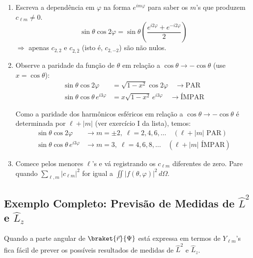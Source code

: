 \begin{enumerate}
    \item[i)] Escreva a dependência em $\varphi$ na forma $e^{im\varphi}$ para saber os $m$'s que produzem $c_{\ell m} \ne 0$.
    \begin{equation}
        \sin\theta\cos2\varphi = \sin\theta\left(\frac{e^{i2\varphi}+e^{-i2\varphi}}{2}\right)
    \label{eq:aula22_dica1_exemplo}
    \end{equation}
    $\Rightarrow$ apenas $c_{2,2}$ e $c_{2,\bar{2}}$ (isto é, $c_{2,-2}$) são não nulos.

    \item[ii)] Observe a paridade da função de $\theta$ em relação a $\cos\theta \to -\cos\theta$ (use $x=\cos\theta$):
    \begin{align}
        \sin\theta\cos2\varphi &= \sqrt{1-x^2}\cos2\varphi \quad \to \text{PAR} \label{eq:aula22_dica2_par} \\
        \sin\theta\cos\theta\,e^{i3\varphi} &= x\sqrt{1-x^2}\,e^{i3\varphi} \quad \to \text{ÍMPAR} \label{eq:aula22_dica2_impar}
    \end{align}

    Como a paridade dos harmônicos esféricos em relação a $\cos\theta \to -\cos\theta$ é determinada por $\ell+|m|$ (ver exercício I da lista), temos:
    \begin{align}
        \sin\theta\cos2\varphi &\to m=\pm2,\;\ell=2,4,6,\dots \quad (\ell+|m| \text{ PAR}) \label{eq:aula22_dica2_caso1} \\
        \sin\theta\cos\theta\,e^{i3\varphi} &\to m=3,\;\ell=4,6,8,\dots \quad (\ell+|m| \text{ ÍMPAR}) \label{eq:aula22_dica2_caso2}
    \end{align}

    \item[iii)] Comece pelos menores $\ell$'s e vá registrando os $c_{\ell m}$ diferentes de zero. Pare quando $\displaystyle\sum_{\ell,m}|c_{\ell m}|^2$ for igual a $\displaystyle\iint |f(\theta,\varphi)|^2 \, d\Omega$.
\end{enumerate}

\subsection*{Exemplo Completo: Previsão de Medidas de $\hat{L}^2$ e $\hat{L}_z$}

Quando a parte angular de $\braket{\vec{r}}{\Psi}$ está expressa em termos de $Y_{\ell m}$'s fica fácil de prever os possíveis resultados de medidas de $\hat{L}^2$ e $\hat{L}_z$.

